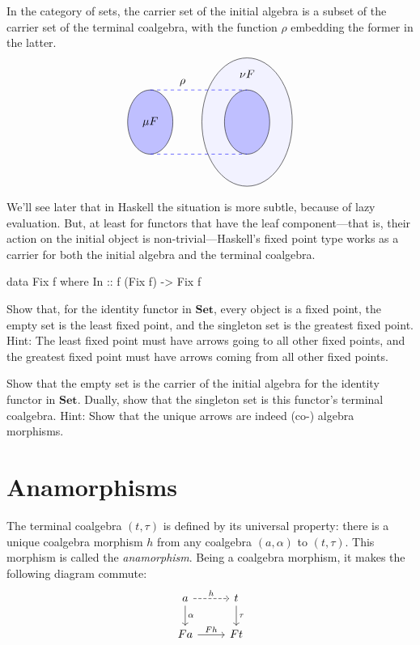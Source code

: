 \documentclass[DaoFP]{subfiles}
\begin{document}
In the category of sets, the carrier set of the initial algebra is a subset of the carrier set of the terminal coalgebra, with the function $\rho$ embedding the former in the latter. 
\[
\begin{tikzpicture}
         \draw (-1,0)[fill=blue!25!white] ellipse (0.7 and 1);
         \draw (2,0)[fill=blue!5!white] ellipse (1.4 and 2);
         \draw (2,0)[fill=blue!25!white] ellipse (0.7 and 1);
         \node[above] at (0, 1) {$\rho$};
       	\draw[dashed, blue] (-1, 1) -- (2, 1);
	\draw[dashed, blue] (-1, -1) -- (2, -1);
        \node at (-1, 0) { $\mu F$ };
        \node at (2, 1.5) { $\nu F$ };
\end{tikzpicture}
\]

We'll see later that in Haskell the situation is more subtle, because of lazy evaluation. But, at least for functors that have the leaf component---that is, their action on the initial object is non-trivial---Haskell's fixed point type works as a carrier for both the initial algebra and the terminal coalgebra.
\begin{haskell}
data Fix f where
  In :: f (Fix f) -> Fix f
\end{haskell}

\begin{exercise}
Show that, for the identity functor in $\mathbf{Set}$, every object is a fixed point, the empty set is the least fixed point, and the singleton set is the greatest fixed point. Hint: The least fixed point must have arrows going to all other fixed points, and the greatest fixed point must have arrows coming from all other fixed points.
\end{exercise}

\begin{exercise}
Show that the empty set is the carrier of the initial algebra for the identity functor in $\mathbf{Set}$. Dually, show that the singleton set is this functor's terminal coalgebra. Hint: Show that the unique arrows are indeed (co-) algebra morphisms.
\end{exercise}

\section{Anamorphisms}

The terminal coalgebra $(t, \tau)$ is defined by its universal property: there is a unique coalgebra morphism $h$ from any coalgebra $(a, \alpha)$ to $(t, \tau)$.  This morphism is called the \emph{anamorphism}. Being a coalgebra morphism, it makes the following diagram commute:
\[
 \begin{tikzcd}
 a 
 \arrow[r, dashed, "h"]
 \arrow[d, "\alpha"]
 & t
\arrow[d, "\tau"]
 \\
 F a
 \arrow[r,  "F h"]
 & F t
  \end{tikzcd}
\]
 
\end{document}
